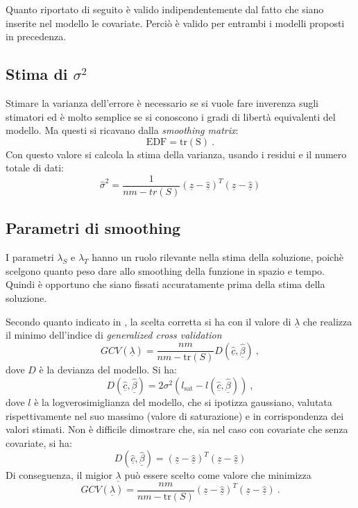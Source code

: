\documentclass[a4paper,11pt,twoside,openright]{book}							%
\begin{document}
Quanto riportato di seguito è valido indipendentemente dal fatto che siano inserite nel modello le covariate. Perciò è valido per entrambi i modelli proposti in precedenza.

\subsection*{Stima di $\sigma^2$}
Stimare la varianza dell'errore è necessario se si vuole fare inverenza sugli stimatori ed è molto semplice se si conoscono i gradi di libertà equivalenti del modello. Ma questi si ricavano dalla \textit{smoothing matrix}:
$$
\mathrm{EDF=tr(S)} \ .
$$
Con questo valore si calcola la stima della varianza, usando i residui e il numero totale di dati:
$$
\hat{\sigma}^2=\frac{1}{nm-tr(S)}(\underline z - \hat  {\underline z})^T(\underline z - \hat  {\underline z})
$$

\subsection*{Parametri di smoothing}
I parametri $\lambda_S$ e $\lambda_T$ hanno un ruolo rilevante nella stima della soluzione, poichè scelgono quanto peso dare allo smoothing della funzione in spazio e tempo. Quindi è opportuno che siano fissati accuratamente prima della stima della soluzione.

Secondo quanto indicato in \cite{art:marra}, la scelta corretta si ha con il valore di $\underline \lambda$ che realizza il minimo dell'indice di \textit{generalized cross validation}
$$
GCV(\underline \lambda) =\frac{nm}{nm-\text{tr}(S)}  D(\hat  {\underline c},\hat  {\underline \beta}) \ ,
$$
dove $D$ è la devianza del modello. Si ha:
$$
D(\hat  {\underline c},\hat  {\underline \beta})=2\sigma^2(l_{\mathrm{sat}}-l(\hat  {\underline c},\hat  {\underline \beta})) \ ,
$$
dove $l$ è la logverosimiglianza del modello, che si ipotizza gaussiano, valutata rispettivamente nel suo massimo (valore di saturazione) e in corrispondenza dei valori stimati. Non è difficile dimostrare che, sia nel caso con covariate che senza covariate, si ha: 
$$
D(\hat  {\underline c},\hat  {\underline \beta}) = (\underline z - \hat  {\underline z})^T(\underline z - \hat  {\underline z})
$$
Di conseguenza, il migior $\underline \lambda$ può essere scelto come valore che minimizza
$$
GCV(\underline \lambda) =\frac{nm}{nm-\text{tr}(S)}  (\underline z - \hat  {\underline z})^T(\underline z - \hat  {\underline z}) \ .
$$
\end{document}
